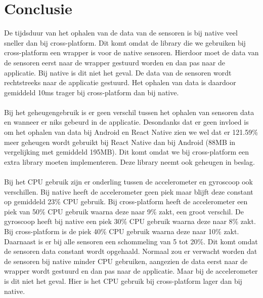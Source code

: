 \section{Conclusie}
De tijdsduur van het ophalen van de data van de sensoren is bij native veel sneller dan bij cross-platform.
Dit komt omdat de library die we gebruiken bij cross-platform een wrapper is voor de native sensoren.
Hierdoor moet de data van de sensoren eerst naar de wrapper gestuurd worden en dan pas naar de applicatie.
Bij native is dit niet het geval. De data van de sensoren wordt rechtstreeks naar de applicatie gestuurd.
Het ophalen van data is daardoor gemiddeld 10ms trager bij cross-platform dan bij native.
\\\\
Bij het geheugengebruik is er geen verschil tussen het ophalen van sensoren data en wanneer er 
niks gebeurd in de applicatie. Desondanks dat er geen invloed is om het ophalen van data bij 
Android en React Native zien we wel dat er 121.59\% meer geheugen wordt gebruikt bij React Native dan 
bij Android (88MB in vergelijking met gemiddeld 195MB). Dit komt omdat we bij cross-platform een extra 
library moeten implementeren. Deze library neemt ook geheugen in beslag.
\\\\
Bij het CPU gebruik zijn er onderling tussen de accelerometer en gyroscoop ook verschillen. Bij native 
heeft de accelerometer geen piek maar blijft deze constant op gemiddeld 23\% CPU gebruik. Bij cross-platform heeft
de accelerometer een piek van 50\% CPU gebruik waarna deze naar 9\% zakt, een groot verschil. 
De gyroscoop heeft bij native een piek 30\% CPU gebruik waarna deze naar 8\% zakt. Bij cross-platform
is de piek 40\% CPU gebruik waarna deze naar 10\% zakt. Daarnaast is er bij alle sensoren een schommeling van 5 tot 20\%. 
Dit komt omdat de sensoren data constant wordt opgehaald. Normaal zou er verwacht worden dat de sensoren bij native 
minder CPU gebruiken, aangezien de data eerst naar de wrapper wordt gestuurd en dan pas naar de applicatie. Maar bij 
de accelerometer is dit niet het geval. Hier is het CPU gebruik bij cross-platform lager dan bij native.
